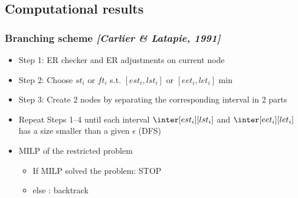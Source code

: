   \subsection{Computational results}

  \begin{frame}
    \frametitle{Branching scheme {\small \it \color{gray!50!black!50} [Carlier \& Latapie, 1991]}}
    \begin{itemize}
      \vfill
    \item Step 1: ER checker and ER adjustments on current node 
      \vfill    
    \item Step 2: Choose $st_i$ or $ft_i$ s.t. $[est_i,lst_i]$ or
      $[eet_i,let_i]$ min
      \vfill
    \item Step 3: Create 2 nodes by separating the corresponding interval in 2 parts
      \vfill
    \item{\color{red!80!black!80} Repeat Steps 1--4 until each interval $\inter[est_i][lst_i]$ and $\inter[eet_i][let_i]$ has a size smaller than a given $\epsilon$ (DFS)}
      \vfill
    \item MILP of the restricted problem
      \begin{itemize}
      \item If MILP solved the problem: STOP
      \item else : backtrack
      \end{itemize}
    \end{itemize}
    \vfill
  \end{frame}


